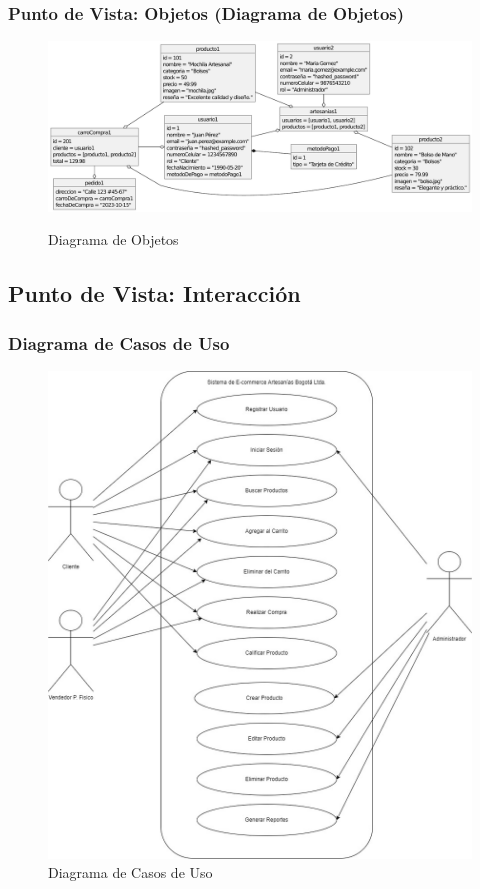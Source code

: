 \documentclass[12pt]{article}
\begin{document}
\subsubsection{Punto de Vista: Objetos (Diagrama de Objetos)}
\begin{figure}[H]
    \centering
    \caption{Diagrama de Objetos}
    \includegraphics[width=\textwidth]{img/DiagramaObjetos.pdf}
    \label{fig:diagrama_objetos}
\end{figure}

\subsection{Punto de Vista: Interacción}

\subsubsection{Diagrama de Casos de Uso}
\begin{figure}[H]
    \centering
    \includegraphics[width=\textwidth]{img/CasosDeUso.jpg}
    \caption{Diagrama de Casos de Uso}
    \label{fig:diagrama_casos_uso}
\end{figure}
\end{document}
